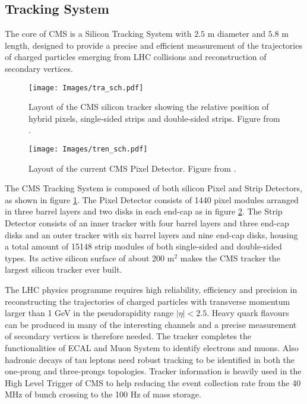 \subsection{Tracking System}
The core of CMS is a Silicon Tracking System \cite{trs} with $2.5$ m diameter and
$5.8$ m length, designed to provide a precise and efficient measurement of the trajectories 
of charged particles emerging from LHC collisions and reconstruction of
secondary vertices.

\begin{figure}
\centering
\texttt{[image: Images/tra\_sch.pdf]}
\caption{Layout of the CMS silicon tracker showing the relative position of
hybrid pixels, single-sided strips and double-sided strips. Figure from \cite{CMS}.}
\label{tra_sch}
\end{figure}
\begin{figure}
\centering
\texttt{[image: Images/tren\_sch.pdf]}
\caption{Layout of the current CMS Pixel Detector. Figure from \cite{trs}.}
\label{tren_sch}
\end{figure}
The CMS Tracking System is composed of both silicon Pixel and Strip Detectors, 
as shown in figure \ref{tra_sch}. The Pixel Detector consists of 1440 pixel modules
arranged in three barrel layers and two disks in each end-cap as in figure \ref{tren_sch}. The
Strip Detector consists of an inner tracker with four barrel layers and three end-cap
disks and an outer tracker with six barrel layers and nine end-cap disks, housing a
total amount of 15148 strip modules of both single-sided and double-sided types.
Its active silicon surface of about 200 m$^2$ makes the CMS tracker the largest silicon
tracker ever built.

The LHC physics programme requires high reliability, efficiency and precision
in reconstructing the trajectories of charged particles with transverse momentum
larger than 1 GeV in the pseudorapidity range $|\eta|<2.5$. Heavy quark flavours
can be produced in many of the interesting channels and a precise measurement
of secondary vertices is therefore needed. The tracker completes the functionalities 
of ECAL and Muon System to identify electrons and muons. Also hadronic
decays of tau leptons need robust tracking to be identified in both the one-prong
and three-prongs topologies. Tracker information is heavily used in the High Level
Trigger of CMS to help reducing the event collection rate from the 40 MHz of
bunch crossing to the 100 Hz of mass storage.

